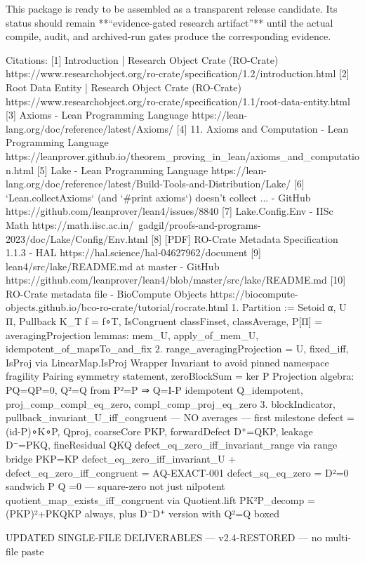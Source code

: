 This package is ready to be assembled as a transparent release candidate. Its status should remain **“evidence-gated research artifact”** until the actual compile, audit, and archived-run gates produce the corresponding evidence.

Citations:
[1] Introduction | Research Object Crate (RO-Crate) https://www.researchobject.org/ro-crate/specification/1.2/introduction.html
[2] Root Data Entity | Research Object Crate (RO-Crate) https://www.researchobject.org/ro-crate/specification/1.1/root-data-entity.html
[3] Axioms - Lean Programming Language https://lean-lang.org/doc/reference/latest/Axioms/
[4] 11. Axioms and Computation - Lean Programming Language https://leanprover.github.io/theorem_proving_in_lean/axioms_and_computation.html
[5] Lake - Lean Programming Language https://lean-lang.org/doc/reference/latest/Build-Tools-and-Distribution/Lake/
[6] `Lean.collectAxioms` (and `#print axioms`) doesn't collect ... - GitHub https://github.com/leanprover/lean4/issues/8840
[7] Lake.Config.Env - IISc Math https://math.iisc.ac.in/~gadgil/proofs-and-programs-2023/doc/Lake/Config/Env.html
[8] [PDF] RO-Crate Metadata Specification 1.1.3 - HAL https://hal.science/hal-04627962/document
[9] lean4/src/lake/README.md at master - GitHub https://github.com/leanprover/lean4/blob/master/src/lake/README.md
[10] RO-Crate metadata file - BioCompute Objects https://biocompute-objects.github.io/bco-ro-crate/tutorial/rocrate.html
1. Partition := Setoid α, U Π, Pullback K_T f = f∘T, IsCongruent
   classFinset, classAverage, P[Π] = averagingProjection
   lemmas: mem_U, apply_of_mem_U, idempotent_of_mapsTo_and_fix
2. range_averagingProjection = U, fixed_iff, IsProj via LinearMap.IsProj
   Wrapper Invariant to avoid pinned namespace fragility
   Pairing symmetry statement, zeroBlockSum = ker P
   Projection algebra: PQ=QP=0, Q²=Q from P²=P ⇒ Q=I-P idempotent
   Q_idempotent, proj_comp_compl_eq_zero, compl_comp_proj_eq_zero
3. blockIndicator, pullback_invariant_U_iff_congruent — NO averages — first milestone
   defect = (id-P)∘K∘P, Qproj, coarseCore PKP, forwardDefect D⁺=QKP,
   leakage D⁻=PKQ, fineResidual QKQ
   defect_eq_zero_iff_invariant_range via range bridge PKP=KP
   defect_eq_zero_iff_invariant_U + defect_eq_zero_iff_congruent = AQ-EXACT-001
   defect_sq_eq_zero = D²=0 sandwich P Q =0 — square-zero not just nilpotent
   quotient_map_exists_iff_congruent via Quotient.lift
   PK²P_decomp = (PKP)²+PKQKP always, plus D⁻D⁺ version with Q²=Q boxed

UPDATED SINGLE-FILE DELIVERABLES — v2.4-RESTORED — no multi-file paste

